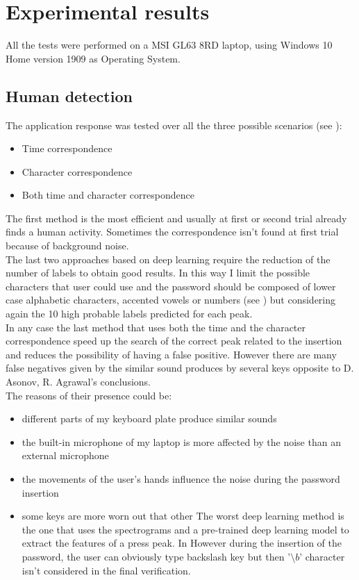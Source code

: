 \chapter{Experimental results}
All the tests were performed on a MSI GL63 8RD laptop, using Windows 10 Home version 1909 as Operating System.

\section{Human detection}
The application response was tested over all the three possible scenarios (see ): 
\begin{itemize}
\item{Time correspondence}
\item{Character correspondence}
\item{Both time and character correspondence}
\end{itemize}
The first method is the most efficient and usually at first or second trial already finds a human activity. Sometimes the correspondence isn't found at first trial because of background noise. \\
The last two approaches based on deep learning require the reduction of the number of labels to obtain good results. In this way I limit the possible characters that user could use and the password should be composed of lower case alphabetic characters, accented vowels or numbers (see ) but considering again the 10 high probable labels predicted for each peak.\\
In any case the last method that uses both the time and the character correspondence speed up the search of the correct peak related to the insertion and reduces the possibility of having a false positive. However there are many false negatives given by the similar sound produces by several keys opposite to D. Asonov, R. Agrawal's conclusions\cite{keyboard_acoustic}.\\
The reasons of their presence could be:
\begin{itemize}
\item{different parts of my keyboard plate produce similar sounds}
\item{the built-in microphone of my laptop is more affected by the noise than an external microphone}
\item{the movements of the user's hands influence the noise during the password insertion}
\item{some keys are more worn out that other}
The worst deep learning method is the one that uses the spectrograms and a pre-trained deep learning model to extract the features of a press peak. In 
However during the insertion of the password, the user can obviously type backslash key but then '$\setminus b$' character isn't considered in the final verification.\\

\end{itemize}
